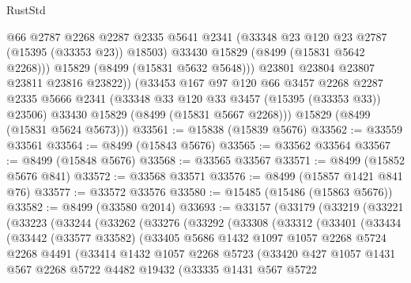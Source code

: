 \begin{lexlean}{RustStd}
\begin{coremodule}
              @66
              @2787
              @2268
              @2287
              @2335
              @5641
              @2341
              (@33348 @23 @120 @23 @2787 (@15395 (@33353 @23)) @18503)
              @33430
              @15829
              (@8499 (@15831 @5642 @2268)))
            @15829
            (@8499 (@15831 @5632 @5648)))
          @23801
          @23804
          @23807
          @23811
          @23816
          @23822))
      (@33453
        @167
        @97
        @120
        @66
        @3457
        @2268
        @2287
        @2335
        @5666
        @2341
        (@33348 @33 @120 @33 @3457 (@15395 (@33353 @33)) @23506)
        @33430
        @15829
        (@8499 (@15831 @5667 @2268)))
      @15829
      (@8499 (@15831 @5624 @5673)))
@33561 := @15838 (@15839 @5676)
@33562 := @33559 @33561
@33564 := @8499 (@15843 @5676)
@33565 := @33562 @33564
@33567 := @8499 (@15848 @5676)
@33568 := @33565 @33567
@33571 := @8499 (@15852 @5676 @841)
@33572 := @33568 @33571
@33576 := @8499 (@15857 @1421 @841 @76)
@33577 := @33572 @33576
@33580 := @15485 (@15486 (@15863 @5676))
@33582 := @8499 (@33580 @2014)
@33693 := @33157
    (@33179
      (@33219
        (@33221
          (@33223
            (@33244
              (@33262
                (@33276
                  (@33292
                    (@33308
                      (@33312
                        (@33401
                          (@33434
                            (@33442
                              (@33577 @33582)
                              (@33405
                                @5686
                                @1432
                                @1097
                                @1057
                                @2268
                                @5724
                                @2268
                                @4491
                                (@33414
                                  @1432
                                  @1057
                                  @2268
                                  @5723
                                  (@33420
                                    @427
                                    @1057
                                    @1431
                                    @567
                                    @2268
                                    @5722
                                    @4482
                                    @19432
                                    (@33335
                                      @1431
                                      @567
                                      @5722

\end{coremodule}
\end{lexlean}
